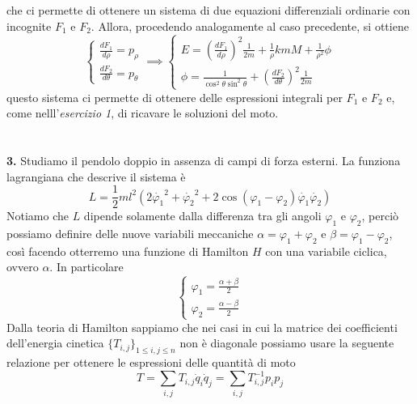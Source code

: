 \documentclass{article}
\begin{document}
che ci permette di ottenere un sistema di due equazioni differenziali ordinarie con incognite $F_1$ e $F_2$. Allora, procedendo analogamente al caso precedente, si ottiene
\begin{equation} \tag{8.2.8}
    \begin{cases}
    \frac{dF_1}{d \rho} = p_\rho \\
    \frac{dF_2}{d \theta} = p_\theta
\end{cases} \implies 
\begin{cases}
    E = \left( \frac{dF_1}{d \rho} \right)^2 \frac{1}{2m} + \frac{1}{\rho}kmM + \frac{1}{\rho^2}\phi \\
    \phi = \frac{1}{\cos^2 \theta \sin^2 \theta} + \left(\frac{dF_2}{d\theta}\right)^2 \frac{1}{2m}
\end{cases}
\end{equation} 
questo sistema ci permette di ottenere delle espressioni integrali per $F_1$ e $F_2$ e, come nelll'\textit{esercizio 1}, di ricavare le soluzioni del moto. \\ \\ \\
\textbf{3.} Studiamo il pendolo doppio in assenza di campi di forza esterni. La funziona lagrangiana che descrive il sistema è
\begin{equation}
    L = \frac{1}{2}ml^2(2\dot{\varphi_1}^2 + \dot{\varphi_2}^2 + 2 \cos(\varphi_1 - \varphi_2)\dot{\varphi_1}\dot{\varphi_2}) \tag{8.3.1}
\end{equation}
Notiamo che $L$ dipende solamente dalla differenza tra gli angoli $\varphi_1$ e $\varphi_2$, perciò possiamo definire delle nuove variabili meccaniche $\alpha = \varphi_1 + \varphi_2$ e $\beta = \varphi_1 - \varphi_2$, così facendo otterremo una funzione di Hamilton $H$ con una variabile ciclica, ovvero $\alpha$. In particolare
\begin{equation}
    \begin{cases}
        \varphi_1 = \frac{\alpha + \beta}{2} \\
        \varphi_2 = \frac{\alpha - \beta}{2}
    \end{cases} \tag{8.3.2}
\end{equation}
Dalla teoria di Hamilton sappiamo che nei casi in cui la matrice dei coefficienti dell'energia cinetica $\{ T_{i,j}\}_{1 \leq i,j \leq n}$ non è diagonale possiamo usare la seguente relazione per ottenere le espressioni delle quantità di moto
\begin{equation}
    T = \sum_{i,j} T_{i,j}\dot{q}_i\dot{q}_j = \sum_{i,j} T^{-1}_{i,j}p_i p_j \tag{8.3.3}
\end{equation}
\end{document}
